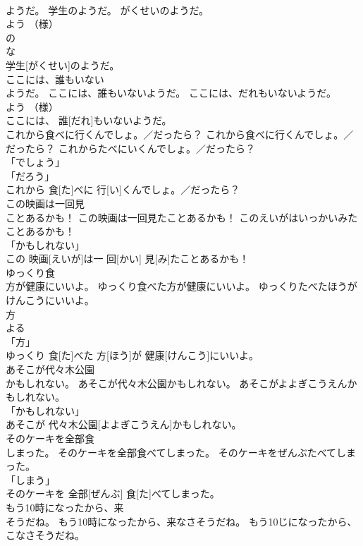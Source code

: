 \documentclass[8pt]{extreport}
\begin{document}
\begin{CJK}{UTF8}{min}
\\	ようだ。	学生のようだ。	がくせいのようだ。	
\\	よう （様） 
\\	の 
\\	な 
\\	学生[がくせい]のようだ。		
\\	ここには、誰もいない
\\	ようだ。	ここには、誰もいないようだ。	ここには、だれもいないようだ。	
\\	よう （様） 
\\	ここには、 誰[だれ]もいないようだ。		
\\	これから食べに行くんでしょ。／だったら？	これから食べに行くんでしょ。／だったら？	これからたべにいくんでしょ。／だったら？	
\\	「でしょう」 
\\	「だろう」 
\\	これから 食[た]べに 行[い]くんでしょ。／だったら？		
\\	この映画は一回見
\\	ことあるかも！	この映画は一回見たことあるかも！	このえいがはいっかいみたことあるかも！	
\\	「かもしれない」 
\\	この 映画[えいが]は一 回[かい] 見[み]たことあるかも！		
\\	ゆっくり食
\\	方が健康にいいよ。	ゆっくり食べた方が健康にいいよ。	ゆっくりたべたほうがけんこうにいいよ。	
\\	方 
\\	よる 
\\	「方」 
\\	ゆっくり 食[た]べた 方[ほう]が 健康[けんこう]にいいよ。		
\\	あそこが代々木公園
\\	かもしれない。	あそこが代々木公園かもしれない。	あそこがよよぎこうえんかもしれない。	
\\	「かもしれない」 
\\	あそこが 代々木公園[よよぎこうえん]かもしれない。		
\\	そのケーキを全部食
\\	しまった。	そのケーキを全部食べてしまった。	そのケーキをぜんぶたべてしまった。	
\\	「しまう」 
\\	そのケーキを 全部[ぜんぶ] 食[た]べてしまった。		
\\	もう10時になったから、来
\\	そうだね。	もう10時になったから、来なさそうだね。	もう10じになったから、こなさそうだね。	

\end{CJK}
\end{document}
